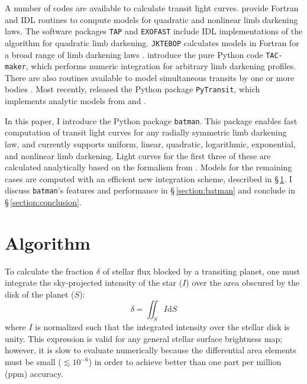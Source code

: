 \documentclass[12pt,preprint]{aastex}
\begin{document}
A number of codes are available to calculate transit light curves. \cite{mandel02} provide Fortran and IDL routines to compute models for quadratic and nonlinear limb darkening laws. The software packages \texttt{TAP} \citep{gazak12} and \texttt{EXOFAST} \citep{eastman13} include IDL implementations of the \cite{mandel02} algorithm for quadratic limb darkening. \texttt{JKTEBOP} calculates models in Fortran for a broad range of limb darkening laws \citep{southworth04}. \cite{kjurkchieva13} introduce the pure Python code \texttt{TAC-maker}, which performs numeric integration for arbitrary limb darkening profiles. There are also routines available to model simultaneous transits by one or more bodies \citep{kipping11, pal12}.  Most recently, \cite{parvianinen15} released the Python package \texttt{PyTransit}, which implements analytic models from \cite{mandel02} and \cite{gimenez06}.  

In this paper, I introduce the Python package \texttt{batman}.  This package enables fast computation of transit light curves for any radially symmetric limb darkening law, and currently supports uniform, linear, quadratic, logarithmic, exponential, and nonlinear limb darkening. Light curves for the first three of these are calculated analytically based on the formalism from \cite{mandel02}.  Models for the remaining cases are computed with an efficient new integration scheme, described in \S\,\ref{section:algorithm}. I discuss \texttt{batman}'s features and performance in \S\,\ref{section:batman} and conclude in \S\,\ref{section:conclusion}.



\section{Algorithm}
\label{section:algorithm}
To calculate the fraction $\delta$ of stellar flux blocked by a transiting planet, one must integrate the sky-projected intensity of the star ($I$) over the area obscured by the disk of the planet ($S$):
\begin{equation}
\delta = \iint_S{I \mathrm{d}S}
\label{eqn:surfaceint}
\end{equation}
where $I$ is normalized such that the integrated intensity over the stellar disk is unity. This expression is valid for any general stellar surface brightness map; however, it is slow to evaluate numerically because the differential area elements must be small ($\lesssim 10^{-6}$) in order to achieve better than one part per million (ppm) accuracy.
\end{document}
